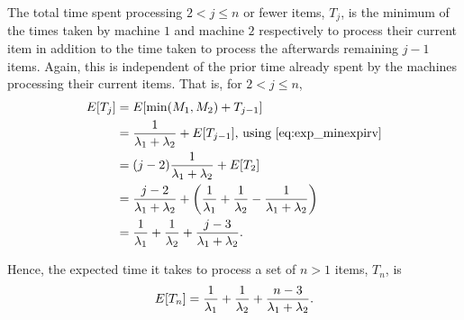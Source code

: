 \documentclass{article}
\begin{document}
\begin{enumerate}
    The total time spent processing $2<j\leq n$ or fewer items, $T_j$, is the minimum of the times taken by machine $1$ and machine $2$ respectively to
    process their current item in addition to the time taken to process the afterwards remaining $j-1$ items. Again, this is independent of
    the prior time already spent by the machines processing their current items. That is, for $2<j\leq n$,
    \begin{equation*}\begin{split}
    E[T_j]  & = E[\min(M_1, M_2) + T_{j-1}] \\
            & = \frac{1}{\lambda_1+\lambda_2} + E[T_{j-1}]\text{, using \eqref{eq:exp_minexpirv}} \\
            & = (j-2)\frac{1}{\lambda_1+\lambda_2} + E[T_2] \\
            & = \frac{j-2}{\lambda_1+\lambda_2} + \left(\frac{1}{\lambda_1} + \frac{1}{\lambda_2} - \frac{1}{\lambda_1+\lambda_2}\right) \\
            & = \frac{1}{\lambda_1} + \frac{1}{\lambda_2} + \frac{j-3}{\lambda_1+\lambda_2} \text. \\
    \end{split}\end{equation*}

    Hence, the expected time it takes to process a set of $n>1$ items, $T_n$, is
    $$E[T_n] = \frac{1}{\lambda_1} + \frac{1}{\lambda_2} + \frac{n-3}{\lambda_1+\lambda_2}\text.$$


\end{enumerate}
\end{document}
